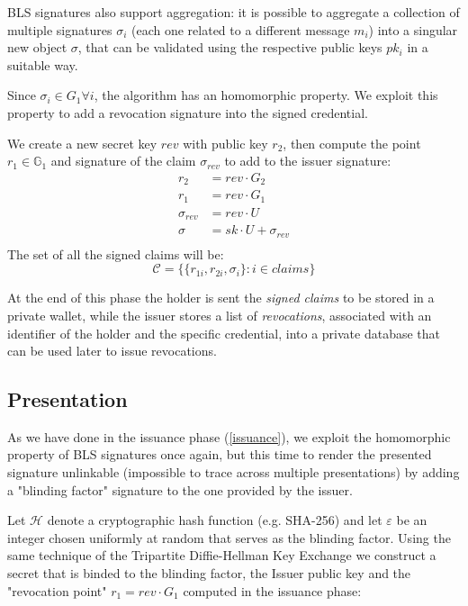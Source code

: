 \documentclass[conference]{IEEEtran}
\begin{document}
BLS signatures also support aggregation: it is possible to aggregate a collection of multiple signatures $\sigma_i$ (each one related to a different message $m_i$) into a singular new object $\sigma$, that can be validated using the respective public keys $pk_i$ in a suitable way.

Since $\sigma_i\in G_1 \forall i$, the algorithm has an homomorphic property. We exploit this property to add a revocation signature into the signed credential.

We create a new secret key $rev$ with public key $r_2$, then compute the point $r_1 \in \mathbb{G}_1$ and signature of the claim $\sigma_{rev}$ to add to the issuer signature:
\begin{equation*}\label{rev_agg}
    \begin{split}
        r_2 &= rev \cdot G_2 \\
        r_1 &= rev \cdot G_1 \\
        \sigma_{rev} &= rev \cdot U\\
        \sigma &= sk\cdot U + \sigma_{rev}\\
   \end{split}
\end{equation*}
The set of all the signed claims will be:
\begin{equation*}
   \mathcal{C} = \big\{ \{ r_{1i}, r_{2i}, \sigma_i \} : i\in claims  \big\}
\end{equation*}

At the end of this phase the holder is sent the \textit{signed claims}
to be stored in a private wallet, while the issuer stores
a list of \textit{revocations}, associated with an identifier of the holder and the specific credential, into a private database that can be used later to
issue revocations.



\subsection{Presentation} \label{presentation}

As we have done in the issuance phase (\ref{issuance}), we exploit the
homomorphic property of BLS signatures once again, but this time to
render the presented signature unlinkable (impossible to trace across
multiple presentations) by adding a "blinding factor" signature to the
one provided by the issuer.

Let $\mathcal{H}$ denote a cryptographic hash function (e.g. SHA-256) and let $\varepsilon$ be an integer chosen uniformly at random that serves as the blinding factor.
Using the same technique of the Tripartite Diffie-Hellman Key Exchange \cite{tripartite} we construct a secret that is binded to the blinding factor, the Issuer public key and the "revocation point" $r_1 = rev \cdot G_1$ computed in the issuance phase:
\end{document}
